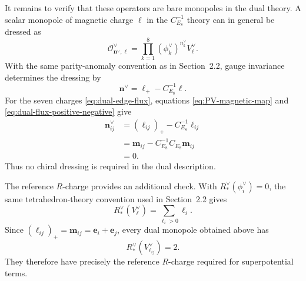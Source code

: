 \documentclass[11pt,a4paper]{article}
\numberwithin{equation}{section}
\begin{document}
It remains to verify that these operators are bare monopoles in the dual theory.  A scalar monopole of magnetic charge $\boldsymbol\ell$ in the $C_{E_8}^{-1}$ theory can in general be dressed as
\begin{equation}
  \mathcal O^\vee_{\boldsymbol n^\vee,\boldsymbol\ell}
  =\prod_{k=1}^{8}(\phi_k^\vee)^{n_k^\vee}
  V^\vee_{\boldsymbol\ell}.
  \label{eq:dual-general-dressed-monopole}
\end{equation}
With the same parity-anomaly convention as in Section~2.2, gauge invariance determines the dressing by
\begin{equation}
  \boldsymbol n^\vee
  =\boldsymbol\ell_+-C_{E_8}^{-1}\boldsymbol\ell.
  \label{eq:dual-monopole-dressing}
\end{equation}
For the seven charges \eqref{eq:dual-edge-flux}, equations \eqref{eq:PV-magnetic-map} and \eqref{eq:dual-flux-positive-negative} give
\begin{equation}
  \begin{aligned}
  \boldsymbol n^\vee_{ij}
  &=(\boldsymbol\ell_{ij})_+
  -C_{E_8}^{-1}\boldsymbol\ell_{ij}\\
  &=\boldsymbol m_{ij}
  -C_{E_8}^{-1}C_{E_8}\boldsymbol m_{ij}\\
  &=0.
  \end{aligned}
  \label{eq:dual-monopoles-bare}
\end{equation}
Thus no chiral dressing is required in the dual description.

The reference $R$-charge provides an additional check.  With $R_*^\vee(\phi_i^\vee)=0$, the same tetrahedron-theory convention used in Section~2.2 gives
\begin{equation}
  R_*^\vee(V^\vee_{\boldsymbol\ell})
  =\sum_{\ell_i>0}\ell_i.
  \label{eq:dual-reference-R}
\end{equation}
Since $(\boldsymbol\ell_{ij})_+=\boldsymbol m_{ij}=\boldsymbol e_i+\boldsymbol e_j$, every dual monopole obtained above has
\begin{equation}
  R_*^\vee(V^\vee_{\boldsymbol\ell_{ij}})=2.
  \label{eq:dual-edge-R-two}
\end{equation}
They therefore have precisely the reference $R$-charge required for superpotential terms.
\end{document}
